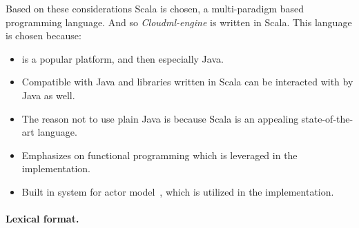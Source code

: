 Based on these considerations Scala is chosen, a multi-paradigm  based programming language.
And so \emph{Cloudml-engine} is written in Scala.
This language is chosen because:
\begin{itemize} 
  \item {} is a popular platform, and then especially Java.
  \item Compatible with Java and libraries written in Scala can be interacted with by Java as well.
  \item The reason not to use plain Java is because Scala is an appealing state-of-the-art language.
  \item Emphasizes on functional programming which is leveraged in the implementation.
  \item Built in system for actor model~\cite{actors:haller07}, which is utilized in the implementation.
\end{itemize}

\paragraph{Lexical format.}


